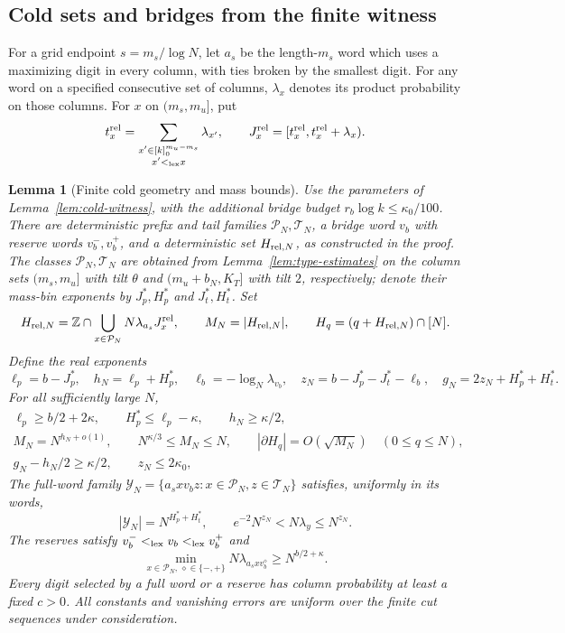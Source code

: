 \documentclass[11pt]{article}
\numberwithin{equation}{section}
\newtheorem{lemma}[lemma]{Lemma}
\newcommand{\1}{\mathbf 1}
\begin{document}
\subsection{Cold sets and bridges from the finite witness}

For a grid endpoint $s=m_s/\log N$, let $a_s$ be the length-$m_s$ word
which uses a maximizing digit in every column, with ties broken by the
smallest digit. For any word on a specified consecutive set of columns,
$\lambda_x$ denotes its product probability on those columns.
For $x$ on $(m_s,m_u]$, put
\[
 t_x^{\rm rel}=\sum_{\substack{x'\in[k]_0^{m_u-m_s}\\x'<_{\rm lex}x}}
                \lambda_{x'},\qquad
 J_x^{\rm rel}=[t_x^{\rm rel},t_x^{\rm rel}+\lambda_x).
\]

\begin{lemma}[Finite cold geometry and mass bounds]
\label{lem:cold-geometry}
Use the parameters of Lemma~\ref{lem:cold-witness}, with the additional
bridge budget $r_b\log k\le\kappa_0/100$. There are deterministic prefix
and tail families $\mathcal P_N,\mathcal T_N$, a bridge word $v_b$ with
reserve words $v_b^-,v_b^+$, and a deterministic set $H_{{\rm rel},N}$,
as constructed in the proof. The classes $\mathcal P_N,\mathcal T_N$
are obtained from Lemma~\ref{lem:type-estimates} on the column sets
$(m_s,m_u]$ with tilt $\theta$ and $(m_u+b_N,K_T]$ with tilt $2$,
respectively; denote their mass-bin exponents by $J_p^*,H_p^*$ and
$J_t^*,H_t^*$. Set
\[
 H_{{\rm rel},N}=\mathbb Z\cap
    \bigcup_{x\in\mathcal P_N}N\lambda_{a_s}J_x^{\rm rel},\qquad
 M_N=|H_{{\rm rel},N}|,\qquad H_q=(q+H_{{\rm rel},N})\cap[N].
\]
Define the real exponents
\[
 \ell_p=b-J_p^*,\quad h_N=\ell_p+H_p^*,\quad
 \ell_b=-\log_N\lambda_{v_b},\quad
 z_N=b-J_p^*-J_t^*-\ell_b,\quad
 g_N=2z_N+H_p^*+H_t^*.
\]
For all sufficiently large $N$,
\begin{gather}
 \ell_p\ge b/2+2\kappa,\qquad H_p^*\le\ell_p-\kappa,\qquad
 h_N\ge\kappa/2,\label{eq:cold-effective-geometry}\\
 M_N=N^{h_N+o(1)},\qquad
 N^{\kappa/3}\le M_N\le N,\qquad
 |\partial H_q|=O(\sqrt{M_N})\quad(0\le q\le N),
 \label{eq:cold-geometric-conclusions}\\
 g_N-h_N/2\ge\kappa/2,\qquad z_N\le2\kappa_0,
 \label{eq:cold-effective-collision}
\end{gather}
The full-word family $\mathcal Y_N=\{a_sxv_bz:x\in\mathcal P_N,z\in\mathcal T_N\}$
satisfies, uniformly in its words,
\begin{equation}
\label{eq:cold-full-word-masses}
 |\mathcal Y_N|=N^{H_p^*+H_t^*},\qquad
 e^{-2}N^{z_N}<N\lambda_y\le N^{z_N}.
\end{equation}
The reserves satisfy $v_b^-<_{\rm lex}v_b<_{\rm lex}v_b^+$ and
\begin{equation}
\label{eq:cold-reserve-means}
 \min_{x\in\mathcal P_N,\,\diamond\in\{-,+\}}
       N\lambda_{a_sxv_b^\diamond}\ge N^{b/2+\kappa}.
\end{equation}
Every digit selected by a full word or a reserve has column probability
at least a fixed $c>0$. All constants and vanishing errors are uniform
over the finite cut sequences under consideration.
\end{lemma}
\end{document}
